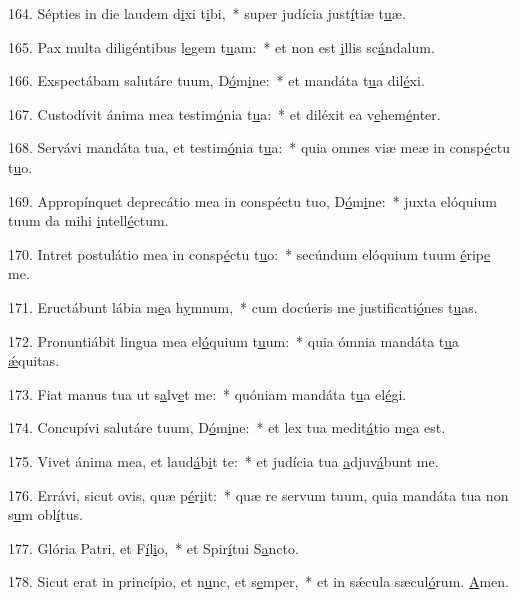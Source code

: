 164. Sépties in die laudem d\uline{i}xi t\uline{i}bi,~* super judícia just\uline{í}tiæ t\uline{u}æ.\par 
165. Pax multa diligéntibus l\uline{e}gem t\uline{u}am:~* et non est \uline{i}llis sc\uline{á}ndalum.\par 
166. Exspectábam salutáre tuum, D\uline{ó}m\uline{i}ne:~* et mandáta t\uline{u}a dil\uline{é}xi.\par 
167. Custodívit ánima mea testim\uline{ó}nia t\uline{u}a:~* et diléxit ea v\uline{e}hem\uline{é}nter.\par 
168. Servávi mandáta tua, et testim\uline{ó}nia t\uline{u}a:~* quia omnes viæ meæ in consp\uline{é}ctu t\uline{u}o.\par 
169. Appropínquet deprecátio mea in conspéctu tuo, D\uline{ó}m\uline{i}ne:~* juxta elóquium tuum da mihi \uline{i}ntell\uline{é}ctum.\par 
170. Intret postulátio mea in consp\uline{é}ctu t\uline{u}o:~* secúndum elóquium tuum \uline{é}rip\uline{e} me.\par 
171. Eructábunt lábia m\uline{e}a h\uline{y}mnum,~* cum docúeris me justificati\uline{ó}nes t\uline{u}as.\par 
172. Pronuntiábit lingua mea el\uline{ó}quium t\uline{u}um:~* quia ómnia mandáta t\uline{u}a \uline{ǽ}quitas.\par 
173. Fiat manus tua ut s\uline{a}lv\uline{e}t me:~* quóniam mandáta t\uline{u}a el\uline{é}gi.\par 
174. Concupívi salutáre tuum, D\uline{ó}m\uline{i}ne:~* et lex tua medit\uline{á}tio m\uline{e}a est.\par 
175. Vivet ánima mea, et laud\uline{á}b\uline{i}t te:~* et judícia tua \uline{a}djuv\uline{á}bunt me.\par 
176. Errávi, sicut ovis, quæ p\uline{é}r\uline{i}it:~* quæ re servum tuum, quia mandáta tua non s\uline{u}m obl\uline{í}tus.\par 
177. Glória Patri, et F\uline{í}l\uline{i}o,~* et Spir\uline{í}tui S\uline{a}ncto.\par 
178. Sicut erat in princípio, et n\uline{u}nc, et s\uline{e}mper,~* et in sǽcula sæcul\uline{ó}rum. \uline{A}men.\par 
